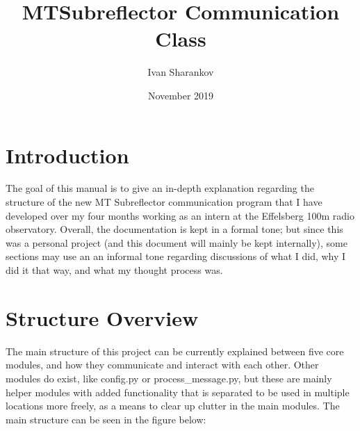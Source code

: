 \documentclass{article}
\title{MTSubreflector Communication Class}
\author{Ivan Sharankov }
\date{November 2019}
\begin{document}
\maketitle
\newpage

\tableofcontents
\newpage




\section{Introduction}

The goal of this manual is to give an in-depth explanation regarding the structure of the new MT Subreflector communication program that I have developed over my four months working as an intern at the Effelsberg 100m radio observatory.  Overall, the documentation  is kept in a formal tone; but since this was a personal project (and this document will mainly be kept internally), some sections may use an an informal tone regarding discussions of what I did, why I did it that way, and what my thought process was. 


\newpage
\section{Structure Overview}

The main structure of this project can be currently explained between five core modules, and how they communicate and interact with each other. Other modules do exist, like config.py or process\_message.py, but these are mainly helper modules with added functionality that is separated to be used in multiple locations more freely, as a means to clear up clutter in the main modules. The main structure can be seen in the figure below:

 \vspace{10pt}
\end{document}
